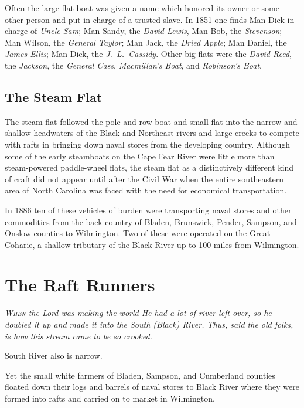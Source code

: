 \documentclass[11pt, a5paper, openright]{book}
\begin{document}
Often the large flat boat was given a name which honored its owner or
some other person and put in charge of a trusted slave.  In 1851 one
finds Man Dick in charge of \textit{Uncle Sam}; Man Sandy, the
\textit{David Lewis}, Man Bob, the \textit{Stevenson}; Man Wilson, the
\textit{General Taylor}; Man Jack, the \textit{Dried Apple}; Man
Daniel, the \textit{James Ellis}; Man Dick, the
\textit{J.~L.~Cassidy}.  Other big flats were the \textit{David Reed},
the \textit{Jackson}, the \textit{General Cass}, \textit{Macmillan's
  Boat}, and \textit{Robinson's Boat}.\par

\section{The Steam Flat}

The steam flat followed the pole and row boat and small flat into the
narrow and shallow headwaters of the Black and Northeast rivers and
large creeks to compete with rafts in bringing down naval stores from
the developing country.  Although some of the early steamboats on the
Cape Fear River were little more than steam-powered paddle-wheel
flats, the steam flat as a distinctively different kind of craft did
not appear until after the Civil War when the entire southeastern area
of North Carolina was faced with the need for economical
transportation.\par

In 1886 ten of these vehicles of burden were transporting naval stores
and other commodities from the back country of Bladen, Brunswick,
Pender, Sampson, and Onslow counties to Wilmington.  Two of these were
operated on the Great Coharie, a shallow tributary of the Black River
up to 100 miles from Wilmington.  \citep[8-13-86]{ws}\par


\chapter{The Raft Runners}

\textit{\textsc{When} the Lord was making the world He had a lot of
  river left over, so he doubled it up and made it into the South
  (Black) River.  Thus, said the old folks, is how this stream came to
  be so crooked.}  \citep{shawg}\par

South River also is narrow.\par

Yet the small white farmers of Bladen, Sampson, and Cumberland
counties floated down their logs and barrels of naval stores to Black
River where they were formed into rafts and carried on to market in
Wilmington.\par
\end{document}
